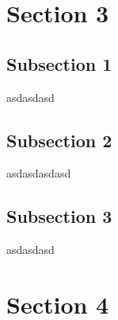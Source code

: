 \section{Section 3}

\subsection{Subsection 1}
asdasdasd

\subsection{Subsection 2}
asdasdasdasd

\subsection{Subsection 3}
asdasdasd

\section{Section 4}


